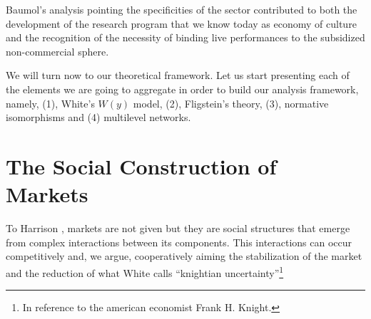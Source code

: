 \documentclass[a4paper, 12pt, openright, oneside, german, french, brazil, english, article]{abntex2}
\begin{document}
	Baumol's analysis pointing the specificities of the sector contributed to both the development of the research program that we know today as economy of culture and the recognition of the necessity of binding live performances to the subsidized non-commercial sphere.
	
	We will turn now to our theoretical framework. Let us start presenting each of the elements we are going to aggregate in order to build our analysis framework, namely, (1), White's $W(y)$ model, (2), Fligstein's theory, (3), normative isomorphisms and (4) multilevel networks.
	
	
	\section{The Social Construction of Markets}
	
	
	To Harrison , markets are not given but they are social structures that emerge from complex interactions between its components. This interactions can occur competitively and, we argue, cooperatively aiming the stabilization of the market and the reduction of what White calls ``knightian uncertainty''\footnote{In reference to the american economist Frank H. Knight.}
	
	
\end{document}
